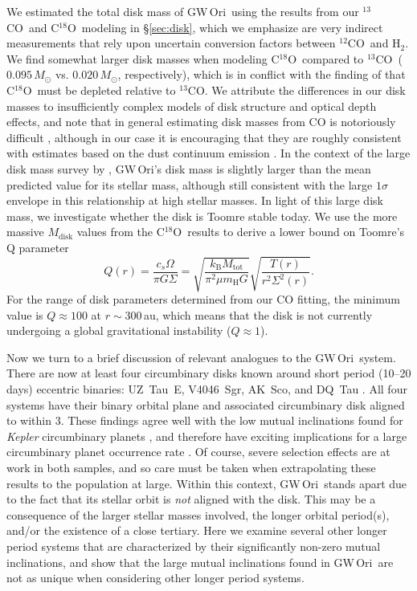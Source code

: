 \documentclass[twocolumn]{aastex61}
\newcommand{\obj}{GW\,Ori}
\newcommand{\twelve}{${}^{12}$CO}
\newcommand{\thirteen}{${}^{13}$CO}
\newcommand{\eighteen}{C${}^{18}$O}
\begin{document}
We estimated the total disk mass of \obj\ using the results from our \thirteen\ and \eighteen\ modeling in \S\ref{sec:disk}, which we emphasize are very indirect measurements that rely upon uncertain conversion factors between \twelve\ and $\mathrm{H}_2$.
We find somewhat larger disk masses when modeling \eighteen\ compared to \thirteen\ ($0.095\,M_\odot$ vs. $0.020\,M_\odot$, respectively), which is in conflict with the finding of \citet{fang17} that \eighteen\ must be depleted relative to \thirteen. We attribute the differences in our disk masses to insufficiently complex models of disk structure and optical depth effects, and note that in general estimating disk masses from CO is notoriously difficult \citep{yu17}, although in our case it is encouraging that they are roughly consistent with estimates based on the dust continuum emission \citep[$0.1\,M_\sun$;][]{fang17}. In the context of the large disk mass survey by \citet{andrews13}, \obj's disk mass is slightly larger than the mean predicted value for its stellar mass, although still consistent with the large $1\sigma$ envelope in this relationship at high stellar masses. In light of this large disk mass, we investigate whether the disk is Toomre stable today. We use the more massive $M_\mathrm{disk}$ values from the \eighteen\ results to derive a lower bound on Toomre's Q parameter
\begin{equation}
Q(r) = \frac{c_s \Omega}{\pi G \Sigma} = \sqrt{\frac{k_\mathrm{B} M_\mathrm{tot}}{\pi^2 \mu m_\mathrm{H} G}} \sqrt{\frac{T(r)}{r^2 \Sigma^2(r)}}.
\end{equation}
For the range of disk parameters determined from our CO fitting, the minimum value is $Q \approx 100$ at $r \sim 300\,$au, which means that the disk is not currently undergoing a global gravitational instability ($Q \approx 1$).

Now we turn to a brief discussion of relevant analogues to the \obj\ system. There are now at least four circumbinary disks known around short period (10--20 days) eccentric binaries: UZ~Tau~E, V4046~Sgr, AK~Sco, and DQ~Tau \citep[][and references therein]{jensen07,rosenfeld12b,czekala15b,czekala16}. All four systems have their binary orbital plane and associated circumbinary disk aligned to within 3\degr. These findings agree well with the low mutual inclinations found for \emph{Kepler} circumbinary planets \citep{winn15}, and therefore have exciting implications for a large circumbinary planet occurrence rate \citep{li16}. Of course, severe selection effects are at work in both samples, and so care must be taken when extrapolating these results to the population at large. Within this context, \obj\ stands apart due to the fact that its stellar orbit is \emph{not} aligned with the disk. This may be a consequence of the larger stellar masses involved, the longer orbital period(s), and/or the existence of a close tertiary. 
Here we examine several other longer period systems that are characterized by their significantly non-zero mutual inclinations, and show that the large mutual inclinations found in \obj\ are not as unique when considering other longer period systems.
\end{document}
